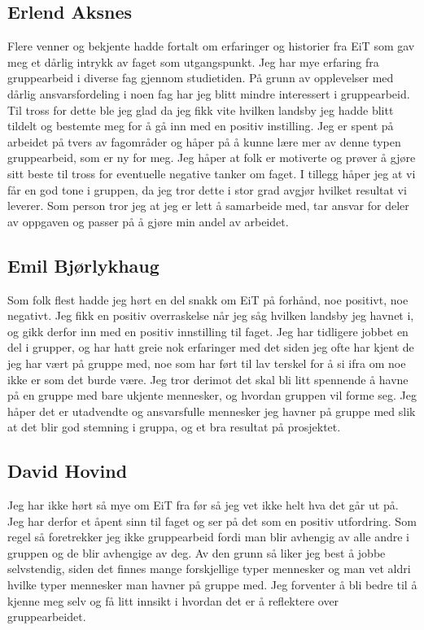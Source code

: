 \subsection*{Erlend Aksnes} Flere venner og bekjente hadde fortalt om erfaringer og historier fra EiT som gav meg et dårlig intrykk av faget som utgangspunkt. 
Jeg har mye erfaring fra gruppearbeid i diverse fag gjennom studietiden.
 På grunn av opplevelser med dårlig ansvarsfordeling i noen fag har jeg blitt mindre interessert i gruppearbeid. 
Til tross for dette ble jeg glad da jeg fikk vite hvilken landsby jeg hadde blitt tildelt og bestemte meg for å gå inn med en positiv instilling.
Jeg er spent på arbeidet på tvers av fagområder og håper på å kunne lære mer av denne typen gruppearbeid, som er ny for meg.  
Jeg håper at folk er motiverte og prøver å gjøre sitt beste til tross for eventuelle negative tanker om faget. 
I tillegg håper jeg at vi får en god tone i gruppen, da jeg tror dette i stor grad avgjør hvilket resultat vi leverer. 
Som person tror jeg at jeg er lett å samarbeide med, tar ansvar for deler av oppgaven og passer på å gjøre min andel av arbeidet. 

\subsection*{Emil Bjørlykhaug}

Som folk flest hadde jeg hørt en del snakk om EiT på forhånd, noe positivt, noe negativt. 
Jeg fikk en positiv overraskelse når jeg såg hvilken landsby jeg havnet i, og gikk derfor 
inn med en positiv innstilling til faget. Jeg har tidligere jobbet en del i grupper, og har 
hatt greie nok erfaringer med det siden jeg ofte har kjent de jeg har vært på gruppe med, 
noe som har ført til lav terskel for å si ifra om noe ikke er som det burde være. 
Jeg tror derimot det skal bli litt spennende å havne på en gruppe med bare ukjente mennesker, 
og hvordan gruppen vil forme seg. Jeg håper det er utadvendte og ansvarsfulle mennesker jeg 
havner på gruppe med slik at det blir god stemning i gruppa, og et bra resultat på prosjektet.

\subsection*{David Hovind} Jeg har ikke hørt så mye om EiT fra før så jeg vet ikke helt hva det går ut på. 
Jeg har derfor et åpent sinn til faget og ser på det som en positiv utfordring. 
Som regel så foretrekker jeg ikke gruppearbeid fordi man blir avhengig av alle andre i gruppen og de blir avhengige av deg. 
Av den grunn så liker jeg best å jobbe selvstendig, siden det finnes mange forskjellige typer mennesker og man vet aldri 
hvilke typer mennesker man havner på gruppe med. Jeg forventer å bli bedre til å kjenne meg selv og få litt innsikt i 
hvordan det er å reflektere over gruppearbeidet.

